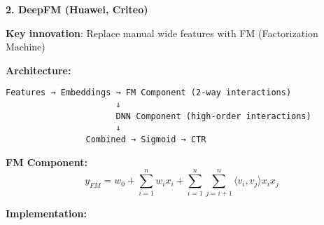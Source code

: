 \documentclass[10pt]{article}
\begin{document}
\textbf{2. DeepFM (Huawei, Criteo)}

\textbf{Key innovation}: Replace manual wide features with FM (Factorization Machine)

\textbf{Architecture:}
\begin{verbatim}
Features → Embeddings → FM Component (2-way interactions)
                      ↓
                      DNN Component (high-order interactions)
                      ↓
                Combined → Sigmoid → CTR
\end{verbatim}

\textbf{FM Component:}
\begin{equation}
y_{FM} = w_0 + \sum_{i=1}^n w_i x_i + \sum_{i=1}^n \sum_{j=i+1}^n \langle v_i, v_j \rangle x_i x_j
\end{equation}

\textbf{Implementation:}
\end{document}
